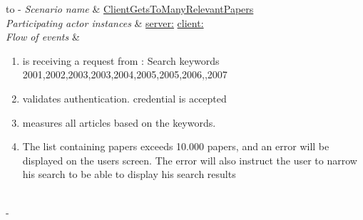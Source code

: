 %
%
\begin{table}[h!]
	\tabulinesep=1.5mm
	\begin{tabu} to 
		\tabucline[1.5pt]-
		\textit{Scenario name} & \underline{ClientGetsToManyRelevantPapers} \\
		\hline
		\textit{Participating actor \newline instances} & \underline{server:\serverside}
		\newline \underline{client:\clientside} \\
		\hline
		\textit{Flow of events} &
		\vspace{-3mm}
		\begin{enumerate}[leftmargin=*,topsep=0pt,itemsep=-1ex]
			\item \serverside is receiving a request from \clientside: Search keywords {2001,2002,2003,2003,2004,2005,2005,2006,,2007}
			
			\item \serverside validates \user authentication. \user credential is accepted
			
			\item \serverside measures all articles based on the keywords.
			
			\item The list containing papers exceeds 10.000 papers, and an error will be displayed on the users screen. The error will also instruct the user to narrow his search to be able to display his search results \\
			
		\end{enumerate} \\
		\tabucline[1.5pt]-
	\end{tabu}
	\caption{Scenario when a user has requested to many papers during one request.}
	\label{sc:ClientGetsToManyRelevantPapers}
\end{table}


